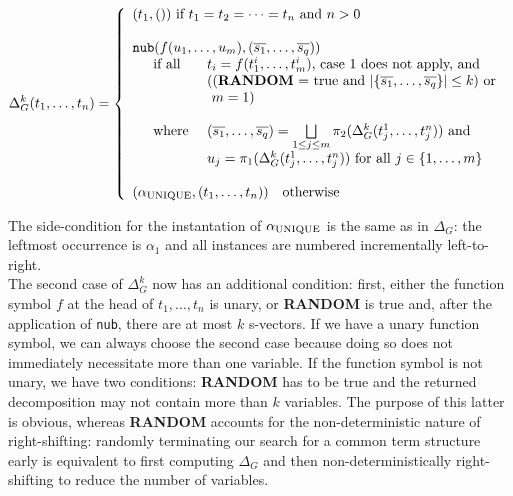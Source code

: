 \documentclass[a4paper, 11pt]{report}
\newcommand{\mt}[1]{\textnormal{#1}}
\begin{document}
$$
  \Delta_G^k(t_1,\dots,t_n) = \left\{
    \begin{array}{l}

    (t_1,()) \mt{ if } t_1 = t_2 = \dots = t_n \mt{ and } n > 0\\
    \\

    \texttt{nub}(f(u_1,\dots,u_m), (\overline{s_1},\dots,\overline{s_q}))
    \\
    \quad
    \begin{array}{l l}
      \mt{if all } & t_i = f(t_1^i,\dots,t_m^i) \mt{, case 1 does not apply, and}\\
      & ((\textbf{RANDOM} \mt{ = true and } |\{\overline{s_1},\dots,\overline{s_q}\}| \leq k) \mt{ or}\\
      & \ m = 1)\\
      \\
      \mt{where } & (\overline{s_1},\dots,\overline{s_q}) = \bigsqcup\limits_{1 \leq j \leq m} \pi_2(\Delta_G^k(t_j^1,\dots,t_j^n)) \mt{ and}\\
                  & u_j = \pi_1(\Delta_G^k(t_j^1,\dots,t_j^n)) \mt{ for all } j \in \{1,\dots,m \}\\
    \end{array}
    
    \\
    \\
    
    (\alpha_{\mt{UNIQUE}},(t_1,\dots,t_n))\quad \mt{otherwise}\\
    \end{array}
  \right.
$$

The side-condition for the instantation of $\alpha_{\mt{UNIQUE}}$ is the same as in $\Delta_G$: the leftmost occurrence is $\alpha_1$ and all instances are numbered incrementally left-to-right.\\

The second case of $\Delta_G^k$ now has an additional condition: first, either the function symbol $f$ at the head of $t_1,\dots,t_n$ is unary, or \textbf{RANDOM} is true and, after the application of \texttt{nub}, there are at most $k$ s-vectors. If we have a unary function symbol, we can always choose the second case because doing so does not immediately necessitate more than one variable. If the function symbol is not unary, we have two conditions: \textbf{RANDOM} has to be true and the returned decomposition may not contain more than $k$ variables. The purpose of this latter is obvious, whereas \textbf{RANDOM} accounts for the non-deterministic nature of right-shifting: randomly terminating our search for a common term structure early is equivalent to first computing $\Delta_G$ and then non-deterministically right-shifting to reduce the number of variables.\\
\end{document}
